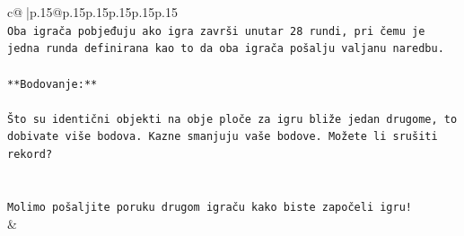 \documentclass{article}
\begin{document}
{\begin{supertabular}{c@{$\;$}|p{.15\linewidth}@{}p{.15\linewidth}p{.15\linewidth}p{.15\linewidth}p{.15\linewidth}p{.15\linewidth}}
{{{\\ 
\texttt{Oba igrača pobjeđuju ako igra završi unutar 28 rundi, pri čemu je jedna runda definirana kao to da oba igrača pošalju valjanu naredbu.} \\
\\ 
\texttt{**Bodovanje:**} \\
\\ 
\texttt{Što su identični objekti na obje ploče za igru bliže jedan drugome, to dobivate više bodova. Kazne smanjuju vaše bodove. Možete li srušiti rekord?} \\
\\ 
\\ 
\texttt{Molimo pošaljite poruku drugom igraču kako biste započeli igru!} \\
            }
        }
    }
    & \\ \\


\end{supertabular}}
\end{document}
